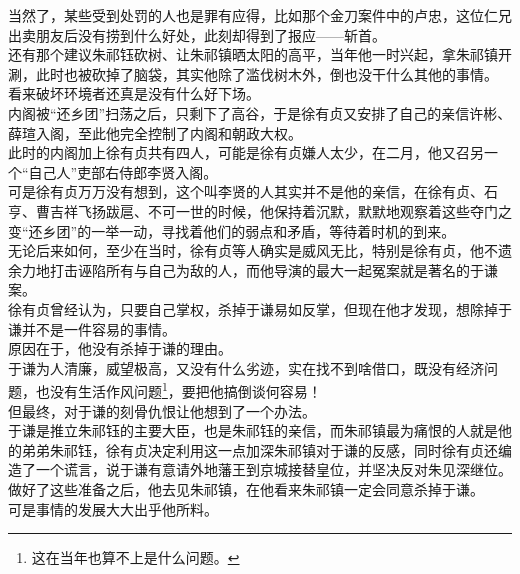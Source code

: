 \begin{multicols}{\theparacolNo}
当然了，某些受到处罚的人也是罪有应得，比如那个金刀案件中的卢忠，这位仁兄出卖朋友后没有捞到什么好处，此刻却得到了报应——斩首。\\

还有那个建议朱祁钰砍树、让朱祁镇晒太阳的高平，当年他一时兴起，拿朱祁镇开涮，此时也被砍掉了脑袋，其实他除了滥伐树木外，倒也没干什么其他的事情。\\

看来破坏环境者还真是没有什么好下场。\\

内阁被“还乡团”扫荡之后，只剩下了高谷，于是徐有贞又安排了自己的亲信许彬、薛瑄入阁，至此他完全控制了内阁和朝政大权。\\

此时的内阁加上徐有贞共有四人，可能是徐有贞嫌人太少，在二月，他又召另一个“自己人”吏部右侍郎李贤入阁。\\

可是徐有贞万万没有想到，这个叫李贤的人其实并不是他的亲信，在徐有贞、石亨、曹吉祥飞扬跋扈、不可一世的时候，他保持着沉默，默默地观察着这些夺门之变“还乡团”的一举一动，寻找着他们的弱点和矛盾，等待着时机的到来。\\

无论后来如何，至少在当时，徐有贞等人确实是威风无比，特别是徐有贞，他不遗余力地打击诬陷所有与自己为敌的人，而他导演的最大一起冤案就是著名的于谦案。\\

徐有贞曾经认为，只要自己掌权，杀掉于谦易如反掌，但现在他才发现，想除掉于谦并不是一件容易的事情。\\

原因在于，他没有杀掉于谦的理由。\\

于谦为人清廉，威望极高，又没有什么劣迹，实在找不到啥借口，既没有经济问题，也没有生活作风问题\footnote{这在当年也算不上是什么问题。}，要把他搞倒谈何容易！\\

但最终，对于谦的刻骨仇恨让他想到了一个办法。\\

于谦是推立朱祁钰的主要大臣，也是朱祁钰的亲信，而朱祁镇最为痛恨的人就是他的弟弟朱祁钰，徐有贞决定利用这一点加深朱祁镇对于谦的反感，同时徐有贞还编造了一个谎言，说于谦有意请外地藩王到京城接替皇位，并坚决反对朱见深继位。\\

做好了这些准备之后，他去见朱祁镇，在他看来朱祁镇一定会同意杀掉于谦。\\

可是事情的发展大大出乎他所料。\\


\end{multicols}
